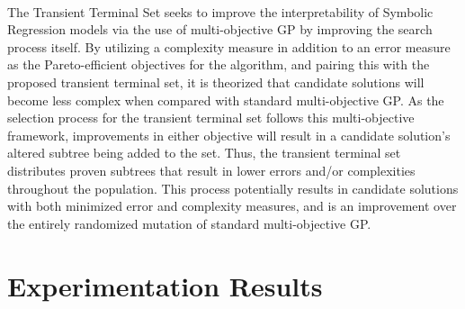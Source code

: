 \documentclass[a4paper]{article}
\begin{document}
\paragraph{} The Transient Terminal Set seeks to improve the interpretability of Symbolic Regression models via the use of multi-objective GP by improving the search process itself. By utilizing a complexity measure in addition to an error measure as the Pareto-efficient objectives for the algorithm, and pairing this with the proposed transient terminal set, it is theorized that candidate solutions will become less complex when compared with standard multi-objective GP. As the selection process for the transient terminal set follows this multi-objective framework, improvements in either objective will result in a candidate solution's altered subtree being added to the set. Thus, the transient terminal set distributes proven subtrees that result in lower errors and/or complexities throughout the population. This process potentially results in candidate solutions with both minimized error and complexity measures, and is an improvement over the entirely randomized mutation of standard multi-objective GP.

\section{Experimentation Results}
\end{document}
